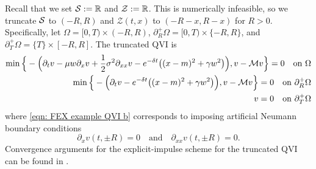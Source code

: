 Recall that we set $\mathcal{S}:= \mathbb{R}$ and $\mathcal{Z} := \mathbb{R}$. This is numerically infeasible, so we truncate $\mathcal{S}$ to $(-R,R)$ and $\mathcal{Z}(t,x)$ to $(-R-x,R-x)$ for $R>0$. Specifically, let $\Omega = [0,T) \times (-R,R)$, $\partial_R^+ \Omega = [0,T)\times \{-R,R\}$, and $\partial_T^+ \Omega = \{T\} \times [-R,R]$. The truncated QVI is
\begin{subequations}\label{eqn: FEX example QVI}
\begin{align}
    \min \Big\{ - \Big( \partial_t v - \mu w \partial_x v + \frac{1}{2} \sigma^2 \partial_{xx} v - e^{-\delta t} \big( (x-m)^2 + \gamma w^2 \big) \Big), v - \mathcal{M} v \Big\} = 0 \quad \text{on } \Omega \label{eqn: FEX example QVI a}\\
    \min \Big\{ - \Big( \partial_t v - e^{-\delta t} \big( (x-m)^2 + \gamma w^2 \big) \Big), v - \mathcal{M} v \Big\} = 0 \quad \text{on } \partial_R^+ \Omega\label{eqn: FEX example QVI b}\\
    v = 0 \quad \text{on } \partial_T^+ \Omega \label{eqn: FEX example QVI c}
\end{align}
\end{subequations}
where \eqref{eqn: FEX example QVI b} corresponds to imposing artificial Neumann boundary conditions
\begin{equation*}
    \partial_xv(t,\pm R) = 0 \quad \text{and} \quad \partial_{xx}v(t,\pm R) = 0. 
\end{equation*}
Convergence arguments for the explicit-impulse scheme for the truncated QVI can be found in \cite[Appendix C]{azimzadeh2018impulsecontrolfinancenumerical}.

